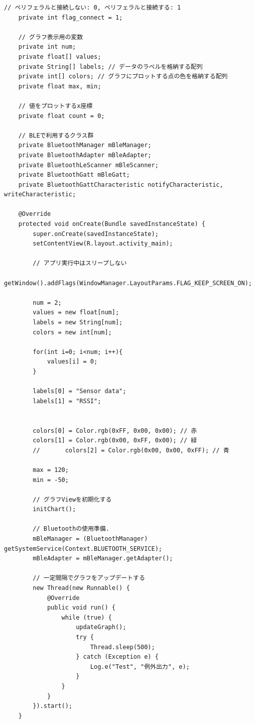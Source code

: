 \documentclass[dvipdfmx,autodetect-engine,titlepage]{jsarticle}
\begin{document}
\begin{lstlisting}[caption=Java.py,label=Java]
    // ペリフェラルと接続しない: 0, ペリフェラルと接続する: 1
    private int flag_connect = 1;

    // グラフ表示用の変数
    private int num;
    private float[] values;
    private String[] labels; // データのラベルを格納する配列
    private int[] colors; // グラフにプロットする点の色を格納する配列
    private float max, min;

    // 値をプロットするx座標
    private float count = 0;

    // BLEで利用するクラス群
    private BluetoothManager mBleManager;
    private BluetoothAdapter mBleAdapter;
    private BluetoothLeScanner mBleScanner;
    private BluetoothGatt mBleGatt;
    private BluetoothGattCharacteristic notifyCharacteristic, writeCharacteristic;

    @Override
    protected void onCreate(Bundle savedInstanceState) {
        super.onCreate(savedInstanceState);
        setContentView(R.layout.activity_main);

        // アプリ実行中はスリープしない
        getWindow().addFlags(WindowManager.LayoutParams.FLAG_KEEP_SCREEN_ON);

        num = 2;
        values = new float[num];
        labels = new String[num];
        colors = new int[num];

        for(int i=0; i<num; i++){
            values[i] = 0;
        }

        labels[0] = "Sensor data";
        labels[1] = "RSSI";


        colors[0] = Color.rgb(0xFF, 0x00, 0x00); // 赤
        colors[1] = Color.rgb(0x00, 0xFF, 0x00); // 緑
        //       colors[2] = Color.rgb(0x00, 0x00, 0xFF); // 青

        max = 120;
        min = -50;

        // グラフViewを初期化する
        initChart();

        // Bluetoothの使用準備.
        mBleManager = (BluetoothManager) getSystemService(Context.BLUETOOTH_SERVICE);
        mBleAdapter = mBleManager.getAdapter();

        // 一定間隔でグラフをアップデートする
        new Thread(new Runnable() {
            @Override
            public void run() {
                while (true) {
                    updateGraph();
                    try {
                        Thread.sleep(500);
                    } catch (Exception e) {
                        Log.e("Test", "例外出力", e);
                    }
                }
            }
        }).start();
    }


\end{lstlisting}
\end{document}
